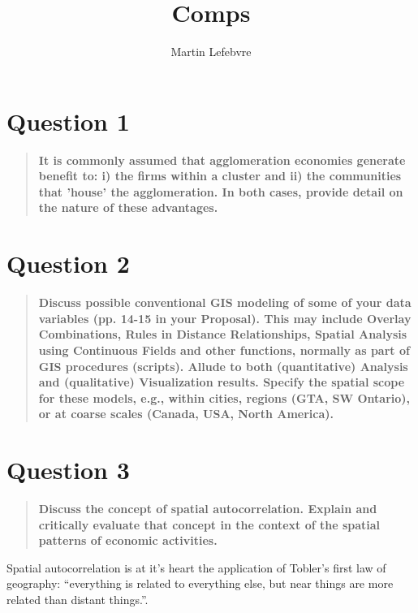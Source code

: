 \documentclass[12pt,letterpaper,notitlepage,onecolumn,final,openbib]{article}
\author{Martin Lefebvre}
\title{Comps}
\begin{document}
	
\section{Question 1}
\begin{quotation}
\textbf{It is commonly assumed that agglomeration economies generate benefit to: i) the firms within a cluster and ii) the communities that 'house' the agglomeration. In both cases, provide detail on the nature of these advantages.}
\end{quotation}
\section{Question 2}
\begin{quotation}
\textbf{Discuss possible conventional GIS modeling of some of your data variables (pp. 14-15 in your Proposal). This may include Overlay Combinations, Rules in Distance Relationships, Spatial Analysis using Continuous Fields and other functions, normally as part of GIS procedures (scripts). Allude to both (quantitative) Analysis and (qualitative) Visualization results. Specify the spatial scope for these models, e.g., within cities, regions (GTA, SW Ontario), or at coarse scales (Canada, USA, North America).}
\end{quotation}
\section{Question 3}
\begin{quotation}
\textbf{Discuss the concept of spatial autocorrelation. Explain and critically evaluate that concept in the context of the spatial patterns of economic activities.}
\end{quotation}

Spatial autocorrelation is at it's heart the application of Tobler's first law of geography: ``everything is related to everything else, but near things are more related than distant things.''\cite[page  236]{toblera1970}.  



	\pagebreak
	
	
\end{document}
